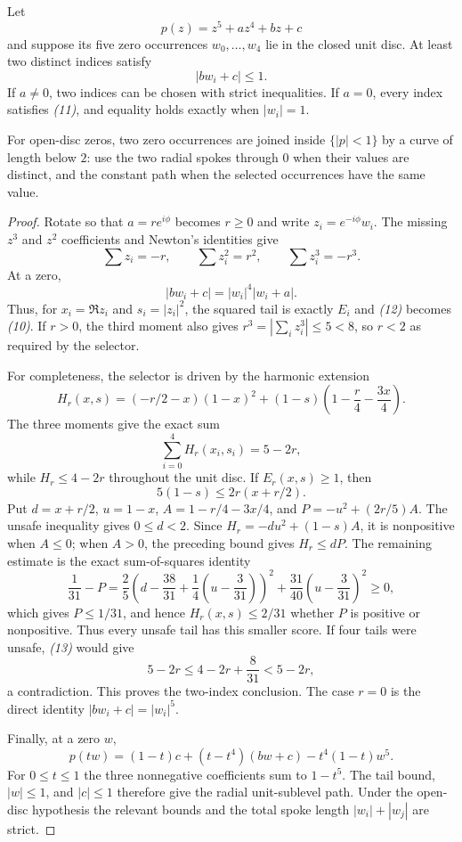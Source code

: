 \documentclass[11pt]{article}
\begin{document}
\begin{theorem}
\label{thm:primitive-quintic-two-tail}
Let
\[
 p(z)=z^5+az^4+bz+c
\]
and suppose its five zero occurrences $w_0,\ldots,w_4$ lie in the closed unit
disc.  At least two distinct indices satisfy
\[
 |bw_i+c|\le1.                                    \tag{11}
\]
If $a\ne0$, two indices can be chosen with strict inequalities.  If $a=0$,
every index satisfies \emph{(11)}, and equality holds exactly when
$|w_i|=1$.

For open-disc zeros, two zero occurrences are joined inside $\{|p|<1\}$ by a
curve of length below $2$: use the two radial spokes through $0$ when their
values are distinct, and the constant path when the selected occurrences
have the same value.
\end{theorem}

\begin{proof}
Rotate so that $a=re^{i\phi}$ becomes $r\ge0$ and write
$z_i=e^{-i\phi}w_i$.  The missing $z^3$ and $z^2$ coefficients and Newton's
identities give
\[
 \sum z_i=-r,\qquad \sum z_i^2=r^2,\qquad
 \sum z_i^3=-r^3.                                 \tag{12}
\]
At a zero,
\[
 |bw_i+c|=|w_i|^4|w_i+a|.
\]
Thus, for $x_i=\Re z_i$ and $s_i=|z_i|^2$, the squared tail is exactly
$E_i$ and \emph{(12)} becomes \emph{(10)}.  If $r>0$, the third moment
also gives $r^3=|\sum_i z_i^3|\le5<8$, so $r<2$ as required by the
selector.

For completeness, the selector is driven by the harmonic extension
\[
 H_r(x,s)=(-r/2-x)(1-x)^2
 +(1-s)\left(1-\frac r4-\frac{3x}{4}\right).
\]
The three moments give the exact sum
\[
 \sum_{i=0}^4H_r(x_i,s_i)=5-2r,                  \tag{13}
\]
while $H_r\le4-2r$ throughout the unit disc.  If $E_r(x,s)\ge1$, then
\[
 5(1-s)\le2r(x+r/2).
\]
Put $d=x+r/2$, $u=1-x$, $A=1-r/4-3x/4$, and
$P=-u^2+(2r/5)A$.  The unsafe inequality gives $0\le d<2$.  Since
$H_r=-du^2+(1-s)A$, it is nonpositive when $A\le0$; when $A>0$,
the preceding bound gives $H_r\le dP$.  The remaining estimate is the exact
sum-of-squares identity
\[
 \frac1{31}-P
 =\frac25\left(d-\frac{38}{31}
               +\frac14(u-\frac3{31})\right)^2
  +\frac{31}{40}\left(u-\frac3{31}\right)^2\ge0,
\]
which gives $P\le1/31$, and hence $H_r(x,s)\le2/31$ whether $P$ is
positive or nonpositive.  Thus every unsafe tail has this smaller score.  If four tails were
unsafe, \emph{(13)} would give
\[
 5-2r\le4-2r+\frac8{31}<5-2r,
\]
a contradiction.  This proves the two-index conclusion.  The case $r=0$ is
the direct identity $|bw_i+c|=|w_i|^5$.

Finally, at a zero $w$,
\[
 p(tw)=(1-t)c+(t-t^4)(bw+c)-t^4(1-t)w^5.
\]
For $0\le t\le1$ the three nonnegative coefficients sum to $1-t^5$.
The tail bound, $|w|\le1$, and $|c|\le1$ therefore give the radial
unit-sublevel path.  Under the open-disc hypothesis the relevant bounds and
the total spoke length $|w_i|+|w_j|$ are strict.
\end{proof}
\end{document}
